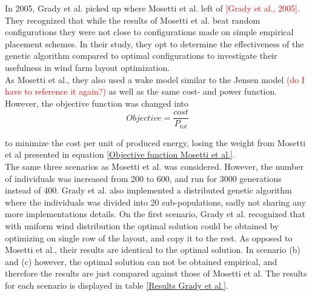 \noindent In 2005, Grady et al. picked up where Mosetti et al. left of \textcolor{red}{[Grady et al., 2005]}. They recognized that while the results of Mosetti et al. beat random configurations they were not close to configurations made on simple empirical placement schemes. In their study, they opt to determine the effectiveness of the genetic algorithm compared to optimal configurations to investigate their usefulness in wind farm layout optimization. \\

\noindent As Mosetti et al., they also used a wake model similar to the Jensen model \textcolor{red}{(do I have to reference it again?)} as well as the same cost- and power function. However, the objective function was changed into\\

\begin{equation}
Objective = \frac{cost}{P_{tot}}
\label{Objective function Grady et al.}
\end{equation}

\noindent to minimize the cost per unit of produced energy, losing the weight from Mosetti et al presented in equation \ref{Objective function Mosetti et al.}.\\

\noindent The same three scenarios as Mosetti et al. was considered. However, the number of individuals was increased from 200 to 600, and run for 3000 generations instead of 400. Grady et al. also implemented a distributed genetic algorithm where the individuals was divided into 20 sub-populations, sadly not sharing any more implementations details. On the first scenario, Grady et al. recognized that with uniform wind distribution the optimal solution could be obtained by optimizing on single row of the layout, and copy it to the rest. As opposed to Mosetti et al., their results are identical to the optimal solution. In scenario (b) and (c) however, the optimal solution can not be obtained empirical, and therefore the results are just compared against those of Mosetti et al. The results for each scenario is displayed in table \ref{Results Grady et al.}. \\

